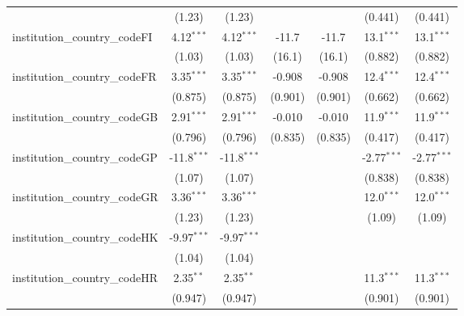 \begin{tabular}{lcccccc}
                                         & (1.23)         & (1.23)         &               &               & (0.441)       & (0.441)\\   
   institution\_country\_codeFI          & 4.12$^{***}$   & 4.12$^{***}$   & -11.7         & -11.7         & 13.1$^{***}$  & 13.1$^{***}$\\   
                                         & (1.03)         & (1.03)         & (16.1)        & (16.1)        & (0.882)       & (0.882)\\   
   institution\_country\_codeFR          & 3.35$^{***}$   & 3.35$^{***}$   & -0.908        & -0.908        & 12.4$^{***}$  & 12.4$^{***}$\\   
                                         & (0.875)        & (0.875)        & (0.901)       & (0.901)       & (0.662)       & (0.662)\\   
   institution\_country\_codeGB          & 2.91$^{***}$   & 2.91$^{***}$   & -0.010        & -0.010        & 11.9$^{***}$  & 11.9$^{***}$\\   
                                         & (0.796)        & (0.796)        & (0.835)       & (0.835)       & (0.417)       & (0.417)\\   
   institution\_country\_codeGP          & -11.8$^{***}$  & -11.8$^{***}$  &               &               & -2.77$^{***}$ & -2.77$^{***}$\\   
                                         & (1.07)         & (1.07)         &               &               & (0.838)       & (0.838)\\   
   institution\_country\_codeGR          & 3.36$^{***}$   & 3.36$^{***}$   &               &               & 12.0$^{***}$  & 12.0$^{***}$\\   
                                         & (1.23)         & (1.23)         &               &               & (1.09)        & (1.09)\\   
   institution\_country\_codeHK          & -9.97$^{***}$  & -9.97$^{***}$  &               &               &               &   \\   
                                         & (1.04)         & (1.04)         &               &               &               &   \\   
   institution\_country\_codeHR          & 2.35$^{**}$    & 2.35$^{**}$    &               &               & 11.3$^{***}$  & 11.3$^{***}$\\   
                                         & (0.947)        & (0.947)        &               &               & (0.901)       & (0.901)\\   

\end{tabular}
